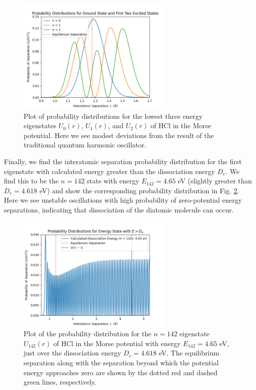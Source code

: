 \documentclass[%
aps, %
prl, %
preprint, %
12pt, %
amsfonts, %
amssymb, %
amsmath, %
endfloats,%
raggedbottom, %
]{revtex4-1}
\begin{document}
\begin{figure}
\centering
\includegraphics[width=0.67\textwidth]{morse_prob_distribs.png}
\caption{\label{fig:MorseProbDistrib} Plot of probability distributions for the lowest three energy
eigenstates $U_0(r)$, $U_1(r)$, and $U_2(r)$ of HCl in the Morse potential. Here we see modest deviations from the result of the
traditional quantum harmonic oscillator.}
\end{figure}

Finally, we find the interatomic separation probability distribution for the first eigenstate with
calculated energy greater than the dissociation energy $D_e$. We find this to be the $n = 142$ state
with energy $E_{142} = 4.65$ eV (slightly greater than $D_e = 4.618$ eV) and show the corresponding
probability distribution in Fig. \ref{fig:DissocProbDistrib}. Here we see unstable oscillations with
high probability of zero-potential energy separations, indicating that dissociation of the diatomic
molecule can occur.

\begin{figure}
\centering
\includegraphics[width=0.67\textwidth]{dissoc_prob_distrib.png}
\caption{\label{fig:DissocProbDistrib} Plot of the probability distribution for the $n = 142$
eigenstate $U_{142}(r)$ of HCl in the Morse potential with energy $E_{142} = 4.65$ eV, just over the
dissociation energy $D_e = 4.618$ eV. The equilibrium separation along with the separation beyond which the
potential energy approaches zero are shown by the dotted red and dashed green lines, respectively.}
\end{figure}
\end{document}
